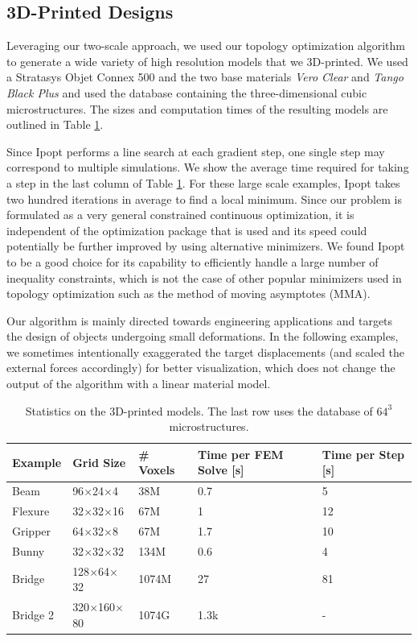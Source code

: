 	\subsection{3D-Printed Designs}
	
	Leveraging our two-scale approach, we used our topology optimization algorithm to generate a wide variety of high resolution models that we 3D-printed. We used a Stratasys Objet Connex 500 and the two base materials \emph{Vero Clear} and \emph{Tango Black Plus} and used the database containing the three-dimensional cubic microstructures. The sizes and computation times of the resulting models are outlined in Table \ref{tab:results}. 
	
	Since Ipopt performs a line search at each gradient step, one single step may correspond to multiple simulations. We show the average time required for taking a step in the last column of Table \ref{tab:results}. For these large scale examples, Ipopt takes two hundred iterations in average to find a local minimum. 
	Since our problem is formulated as a very general constrained continuous optimization, it is independent of the optimization package that is used and its speed could potentially be further improved by using alternative minimizers. 
	We found Ipopt to be a good choice for its capability to efficiently handle a large number of inequality constraints, which is not the case of other popular minimizers used in topology optimization such as the method of moving asymptotes (MMA).
	
	Our algorithm is mainly directed towards engineering applications and targets the design of objects undergoing small deformations. In the following examples, we sometimes intentionally exaggerated the target displacements (and scaled the external forces accordingly) for better visualization, which does not change the output of the algorithm with a linear material model.
	
	\begin{table}
		\centering
		\footnotesize
		\caption{Statistics on the 3D-printed models. The last row uses the database of $64^3$ microstructures.} 
		{
			\begin{tabularx}{\linewidth}{ |X| X | X | p{1cm}| p{1cm}| }
				\hline
				Example & Grid Size & \# Voxels & Time per FEM Solve [s] & Time per Step [s]\\ \hline
				Beam   & 96$\times$24$\times$4  & 38M  &  0.7 & 5\\
				Flexure & 32$\times$32$\times$16 & 67M  & 1 & 12\\
				Gripper   & 64$\times$32$\times$8  & 67M  & 1.7 & 10\\	\hline
				Bunny & 32$\times$32$\times$32 & 134M  & 0.6 & 4 \\
				Bridge & 128$\times$64$\times$32 & 1074M  & 27 & 81\\
				Bridge 2 & 320$\times$160$\times$80 & 1074G  & 1.3k & - \\
				\hline
			\end{tabularx} }
			\label{tab:results}
		\end{table}
		
